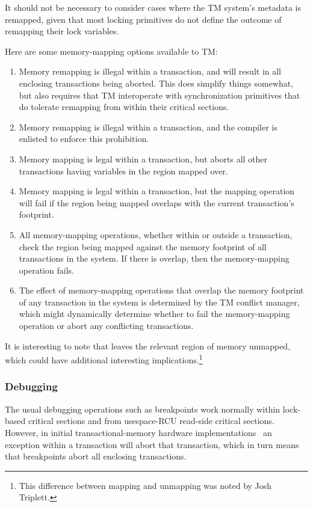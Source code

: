 It should not be necessary to consider cases where the TM system's
metadata is remapped, given that most locking primitives do not define
the outcome of remapping their lock variables.

Here are some memory-mapping options available to TM:

\begin{enumerate}
\item	Memory remapping is illegal within a transaction, and will result
	in all enclosing transactions being aborted.
	This does simplify things somewhat, but also requires that TM
	interoperate with synchronization primitives that do tolerate
	remapping from within their critical sections.
\item	Memory remapping is illegal within a transaction, and the
	compiler is enlisted to enforce this prohibition.
\item	Memory mapping is legal within a transaction, but aborts all
	other transactions having variables in the region mapped over.
\item	Memory mapping is legal within a transaction, but the mapping
	operation will fail if the region being mapped overlaps with
	the current transaction's footprint.
\item	All memory-mapping operations, whether within or outside a
	transaction, check the region being mapped against the memory
	footprint of all transactions in the system.
	If there is overlap, then the memory-mapping operation fails.
\item	The effect of memory-mapping operations that overlap the memory
	footprint of any transaction in the system is determined by the
	TM conflict manager, which might dynamically determine whether
	to fail the memory-mapping operation or abort any conflicting
	transactions.
\end{enumerate}

It is interesting to note that  leaves the relevant region
of memory unmapped, which could have additional interesting
implications.\footnote{
	This difference between mapping and unmapping was noted by
	Josh Triplett.}

\subsubsection{Debugging}
\label{sec:future:Debugging}

The usual debugging operations such as breakpoints work normally within
lock-based critical sections and from usespace-RCU read-side critical sections.
However, in initial transactional-memory hardware
implementations~\cite{DaveDice2009ASPLOSRockHTM} an exception within
a transaction will abort that transaction, which in turn means that
breakpoints abort all enclosing transactions.

